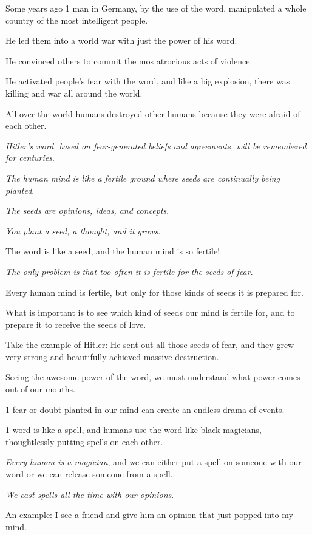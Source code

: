\documentclass{article}
\numberwithin{equation}{section}
\begin{document}
Some years ago 1 man in Germany, by the use of the word, manipulated a whole country of the most intelligent people.

He led them into a world war with just the power of his word.

He convinced others to commit the mos atrocious acts of violence.

He activated people's fear with the word, and like a big explosion, there was killing and war all around the world.

All over the world humans destroyed other humans because they were afraid of each other.

\textit{Hitler's word, based on fear-generated beliefs and agreements, will be remembered for centuries}.

%
\textit{The human mind is like a fertile ground where seeds are continually being planted}.

\textit{The seeds are opinions, ideas, and concepts}.

\textit{You plant a seed, a thought, and it grows}.

The word is like a seed, and the human mind is so fertile!

\textit{The only problem is that too often it is fertile for the seeds of fear}.

Every human mind is fertile, but only for those kinds of seeds it is prepared for.

What is important is to see which kind of seeds our mind is fertile for, and to prepare it to receive the seeds of love.

%
Take the example of Hitler: He sent out all those seeds of fear, and they grew very strong and beautifully achieved massive destruction.

Seeing the awesome power of the word, we must understand what power comes out of our mouths.

1 fear or doubt planted in our mind can create an endless drama of events.

1 word is like a spell, and humans use the word like black magicians, thoughtlessly putting spells on each other.

%
\textit{Every human is a magician}, and we can either put a spell on someone with our word or we can release someone from a spell.

\textit{We cast spells all the time with our opinions}.

An example: I see a friend and give him an opinion that just popped into my mind.
\end{document}
